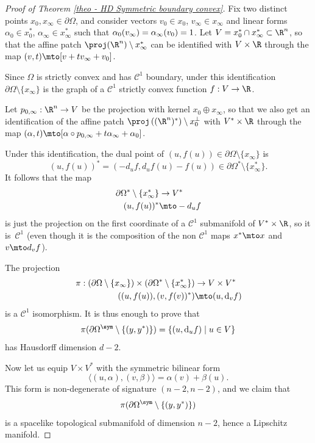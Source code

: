 \begin{proof}[Proof of Theorem \ref{theo - HD Symmetric boundary convex}]
Fix two distinct points $x_0,x_\infty\in \partial \Omega$, and consider vectors $v_0\!\in\!x_0$, $v_\infty\!\in\!x_\infty$ and linear forms $\alpha_0\!\in\!x_0^*$, $\alpha_\infty\!\in\!x_\infty^*$ such that $\alpha_0(v_\infty)=\alpha_\infty(v_0)=\nobreak1$. Let $V=x_0^*\cap x_\infty^*\subset \R^n$, so that the affine patch $\proj(\R^n)\setminus x_\infty^*$ can be identified with $V\times \R$ through the map $(v,t)\mto [v+tv_\infty+v_0]$.

Since $\Omega$ is strictly convex and has $\mathcal C^1$ boundary, under this identification $\partial\Omega\setminus \{x_\infty\}$ is the graph of a $\mathcal C^1$ strictly convex function $f:V\to \R$.

Let $p_{0,\infty}:\R^n\to V$ be the projection with kernel $x_0\oplus x_\infty$, so that we also get an identification of the affine patch $\proj\left((\R^n)^*\right)\setminus x_0^\perp$ with $V^*\times \R$ through the map $(\alpha,t)\mto [\alpha\circ p_{0,\infty} + t \alpha_\infty + \alpha_0]$.

Under this identification, the dual point of $(u,f(u))\in \partial \Omega\setminus \{x_\infty\}$ is
\[
(u,f(u))^*=(-d_uf,d_uf(u)-f(u))\in \partial\Omega^*\setminus \{x_\infty^*\}.
\]
It follows that the map
\begin{align*}
\partial\Omega^*\setminus \{x_\infty^*\} & \to V^* \\
(u,f(u))^* & \mto -d_uf
\end{align*}
is just the projection on the first coordinate of a $\mathcal C^1$ submanifold of $V^*\times \R$, so it is~$\mathcal C^1$ (even though it is the composition of the non $\mathcal C^1$ maps $x^*\mto x$ and $v\mto d_vf$).

The projection
\begin{align*}
\pi: \left(\partial \Omega \setminus \{x_\infty\}\right)\times \left(\partial \Omega^*\setminus \{x_\infty^*\}\right) & \to V\times V^*\\
\left((u, f(u)), (v,f(v))^*\right) & \mto (u, \mathrm d_v f)
\end{align*}
is a $\mathcal C^1$ isomorphism. It is thus enough to prove that
\[\pi(\partial \Omega^{\sym} \setminus \{(y,y^*)\}) = \{(u, \mathrm d_u f)\mid u\in V\}\]
has Hausdorff dimension $d-2$.

Now let us equip $V \times V^*$ with the symmetric bilinear form
\[\langle (u,\alpha), (v,\beta)\rangle = \alpha(v) + \beta(u).\]
This form is non-degenerate of signature $(n-2,n-2)$, and we claim that
\[
\pi(\partial \Omega^{\sym} \setminus \{(y,y^*)\})
\]
is a spacelike topological submanifold of dimension $n-2$, hence a Lipschitz manifold.


\end{proof}
